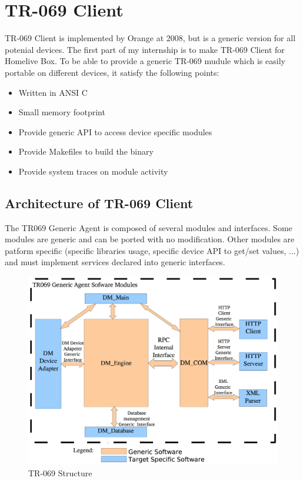 
\chapter{TR-069 Client} %

\label{Chapter5} %


TR-069 Client is implemented by Orange at 2008, but is a generic version for all potenial devices. The first part of my internship is to make TR-069 Client for Homelive Box. To be able to provide a generic TR-069 mudule which is easily portable on different devices, it satisfy the following points:

\begin{itemize}
  \item Written in ANSI C
  \item Small memory footprint
  \item Provide generic API to access device specific modules
  \item Provide Makefiles to build the binary
  \item Provide system traces on module activity
\end{itemize}
\section{Architecture of TR-069 Client}
The TR069 Generic Agent is composed of several modules and interfaces. Some modules are generic and can be ported with no modification. Other modules are patform specific (specific libraries usage, specific device API to get/set values, ...) and must implement services declared into generic interfaces.

\begin{figure}[htbp]
	\centering
		\includegraphics[width=12cm]{Figures/structuretr069.png}
	\caption[TR-069 Structure]{TR-069 Structure}
	\label{fig:tr069}
\end{figure}

